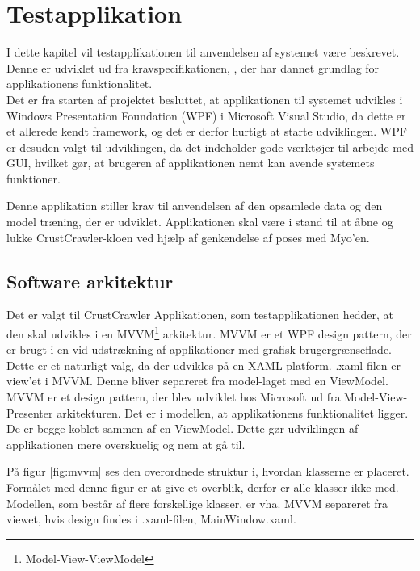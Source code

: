\thispagestyle{fancy}
\chapter{Testapplikation}
\label{chp:testapp}
I dette kapitel vil testapplikationen til anvendelsen af systemet være beskrevet. Denne er udviklet ud fra kravspecifikationen, \citep{RefWorks:8}, der har dannet grundlag for applikationens funktionalitet. \\
Det er fra starten af projektet besluttet, at applikationen til systemet udvikles i Windows Presentation Foundation (WPF) i Microsoft Visual Studio, da dette er et allerede kendt framework, og det er derfor hurtigt at starte udviklingen. WPF er desuden valgt til udviklingen, da det indeholder gode værktøjer til arbejde med GUI, hvilket gør, at brugeren af applikationen nemt kan avende systemets funktioner.

Denne applikation stiller krav til anvendelsen af den opsamlede data og den model træning, der er udviklet. Applikationen skal være i stand til at åbne og lukke CrustCrawler-kloen ved hjælp af genkendelse af poses med Myo'en.

\section{Software arkitektur}
Det er valgt til CrustCrawler Applikationen, som testapplikationen hedder, at den skal udvikles i en MVVM\footnote{Model-View-ViewModel} arkitektur\citep{RefWorks:14}. MVVM er et WPF design pattern, der er brugt i en vid udstrækning af applikationer med grafisk brugergrænseflade. Dette er et naturligt valg, da der udvikles på en XAML platform. .xaml-filen er view'et i MVVM. Denne bliver separeret fra model-laget med en ViewModel. MVVM er et design pattern, der blev udviklet hos Microsoft ud fra Model-View-Presenter arkitekturen\citep{mvp}. Det er i modellen, at applikationens funktionalitet ligger. De er begge koblet sammen af en ViewModel. Dette gør udviklingen af applikationen mere overskuelig og nem at gå til.


På figur \ref{fig:mvvm} ses den overordnede struktur i, hvordan klasserne er placeret. Formålet med denne figur er at give et overblik, derfor er alle klasser ikke med. Modellen, som består af flere forskellige klasser, er vha. MVVM separeret fra viewet, hvis design findes i .xaml-filen, MainWindow.xaml.

